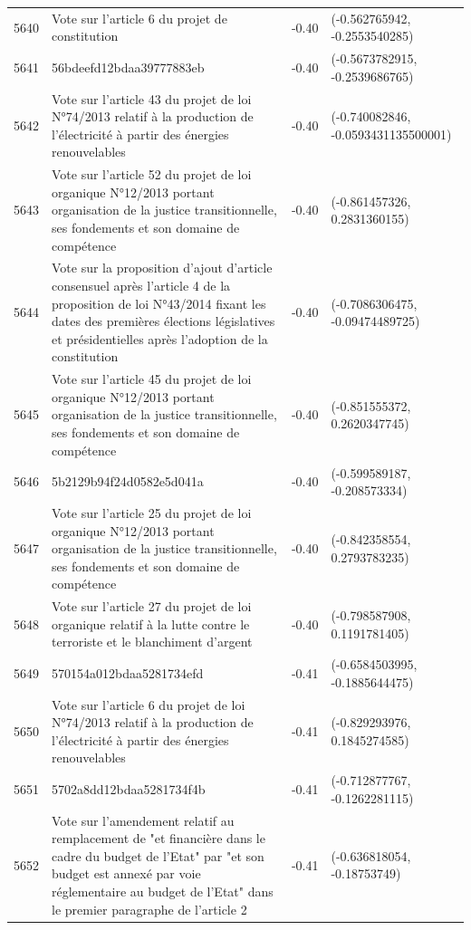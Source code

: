 \begin{table}[ht]
\begin{tabular}{rlrl}
  5640 & Vote sur l'article 6 du projet de constitution & -0.40 & (-0.562765942, -0.2553540285) \\ 
  5641 & 56bdeefd12bdaa39777883eb & -0.40 & (-0.5673782915, -0.2539686765) \\ 
  5642 & Vote sur l'article 43 du projet de loi N°74/2013 relatif à la production de l'électricité à partir des énergies renouvelables & -0.40 & (-0.740082846, -0.0593431135500001) \\ 
  5643 & Vote sur l'article 52 du projet de loi organique N°12/2013 portant organisation de la justice transitionnelle, ses fondements et son domaine de compétence & -0.40 & (-0.861457326, 0.2831360155) \\ 
  5644 & Vote sur la proposition d'ajout d'article consensuel après l'article 4 de la proposition de loi N°43/2014 fixant les dates des premières élections législatives et présidentielles après l'adoption de la constitution & -0.40 & (-0.7086306475, -0.09474489725) \\ 
  5645 & Vote sur l'article 45 du projet de loi organique N°12/2013 portant organisation de la justice transitionnelle, ses fondements et son domaine de compétence & -0.40 & (-0.851555372, 0.2620347745) \\ 
  5646 & 5b2129b94f24d0582e5d041a & -0.40 & (-0.599589187, -0.208573334) \\ 
  5647 & Vote sur l'article 25 du projet de loi organique N°12/2013 portant organisation de la justice transitionnelle, ses fondements et son domaine de compétence & -0.40 & (-0.842358554, 0.2793783235) \\ 
  5648 & Vote sur l'article 27 du projet de loi organique relatif à la lutte contre le terroriste et le blanchiment d'argent & -0.40 & (-0.798587908, 0.1191781405) \\ 
  5649 & 570154a012bdaa5281734efd & -0.41 & (-0.6584503995, -0.1885644475) \\ 
  5650 & Vote sur l'article 6 du projet de loi N°74/2013 relatif à la production de l'électricité à partir des énergies renouvelables & -0.41 & (-0.829293976, 0.1845274585) \\ 
  5651 & 5702a8dd12bdaa5281734f4b & -0.41 & (-0.712877767, -0.1262281115) \\ 
  5652 & Vote sur l'amendement relatif au remplacement de "et financière dans le cadre du budget de l’Etat" par "et son budget est annexé par voie réglementaire au budget de l'Etat" dans le premier paragraphe de l'article 2 & -0.41 & (-0.636818054, -0.18753749) \\ 

\end{tabular}
\end{table}
